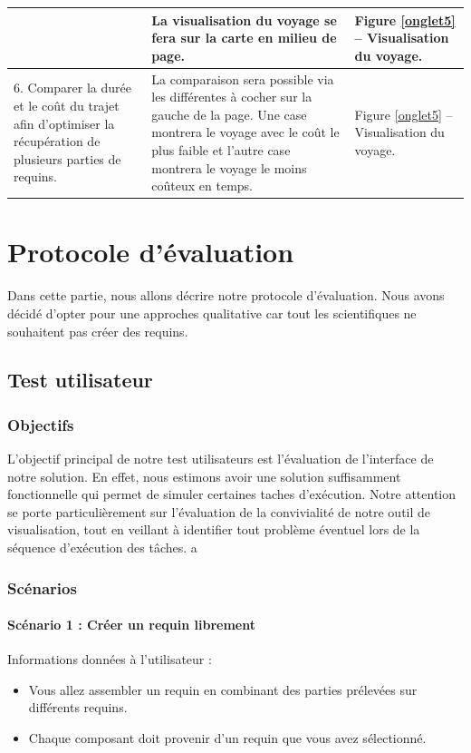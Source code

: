 \documentclass{article}
\begin{document}
\begin{center}
\begin{tabular}{|p{3.5cm}|p{7cm}|p{3.5cm}|}
		 &
		La visualisation du voyage se fera sur la carte en milieu de page.
		 &
		Figure \ref{onglet5} – Visualisation du voyage.
		\\\hline
		6. Comparer la durée et le coût du trajet afin d’optimiser la récupération de plusieurs parties de requins.
		 &
		La comparaison sera possible via les différentes à cocher sur la gauche de la page. Une case montrera le voyage avec le coût le plus faible et l’autre case montrera le voyage le moins coûteux en temps.
		 &
		Figure \ref{onglet5} – Visualisation du voyage.
		\\\hline
	\end{tabular}
\end{center}

\section{Protocole d'évaluation}
Dans cette partie, nous allons décrire notre protocole d’évaluation. Nous avons décidé d'opter pour une approches qualitative car tout les scientifiques ne souhaitent pas créer des requins.

\subsection{Test utilisateur}

\subsubsection{Objectifs}
L'objectif principal de notre test utilisateurs est l'évaluation de l'interface de notre solution. En effet, nous estimons avoir une solution suffisamment fonctionnelle qui permet de simuler certaines taches d'exécution.
Notre attention se porte particulièrement sur l'évaluation de la convivialité de notre outil de visualisation, tout en veillant à identifier tout problème éventuel lors de la séquence d'exécution des tâches.
a

\subsubsection{Scénarios}

\paragraph{Scénario 1 : Créer un requin librement}
Informations données à l'utilisateur :
\begin{itemize}
	\item Vous allez assembler un requin en combinant des parties prélevées sur différents requins.
	\item Chaque composant doit provenir d'un requin que vous avez sélectionné.
\end{itemize}
\end{document}

